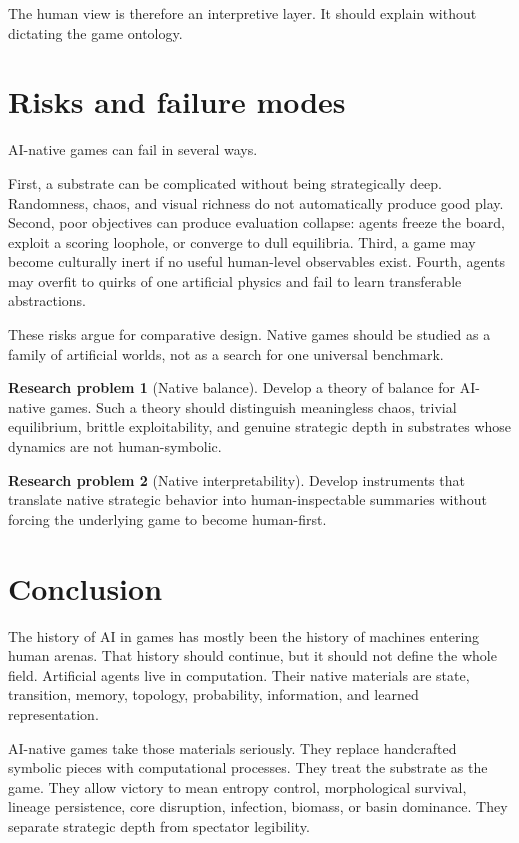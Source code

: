 \documentclass[11pt,a4paper]{article}
\theoremstyle{plain}
\theoremstyle{definition}
\newtheorem*{problem}{Research problem}
\begin{document}
The human view is therefore an interpretive layer. It should explain without dictating the game ontology.

\section{Risks and failure modes}\label{sec:risks}

AI-native games can fail in several ways.

First, a substrate can be complicated without being strategically deep. Randomness, chaos, and visual richness do not automatically produce good play. Second, poor objectives can produce evaluation collapse: agents freeze the board, exploit a scoring loophole, or converge to dull equilibria. Third, a game may become culturally inert if no useful human-level observables exist. Fourth, agents may overfit to quirks of one artificial physics and fail to learn transferable abstractions.

These risks argue for comparative design. Native games should be studied as a family of artificial worlds, not as a search for one universal benchmark.

\begin{problem}[Native balance]\label{prob:native-balance}
Develop a theory of balance for AI-native games. Such a theory should distinguish meaningless chaos, trivial equilibrium, brittle exploitability, and genuine strategic depth in substrates whose dynamics are not human-symbolic.
\end{problem}

\begin{problem}[Native interpretability]\label{prob:native-interpretability}
Develop instruments that translate native strategic behavior into human-inspectable summaries without forcing the underlying game to become human-first.
\end{problem}

\section{Conclusion}\label{sec:conclusion}

The history of AI in games has mostly been the history of machines entering human arenas. That history should continue, but it should not define the whole field. Artificial agents live in computation. Their native materials are state, transition, memory, topology, probability, information, and learned representation.

AI-native games take those materials seriously. They replace handcrafted symbolic pieces with computational processes. They treat the substrate as the game. They allow victory to mean entropy control, morphological survival, lineage persistence, core disruption, infection, biomass, or basin dominance. They separate strategic depth from spectator legibility.
\end{document}
